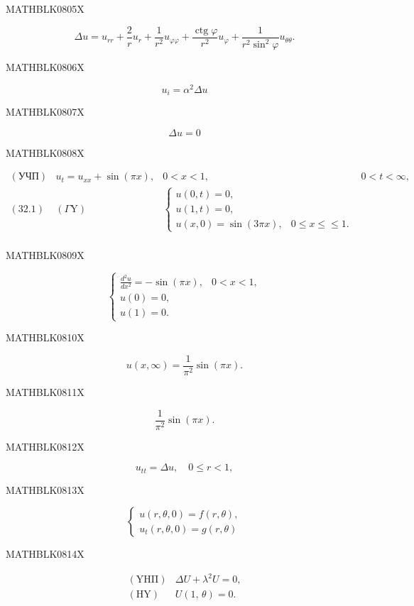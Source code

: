 \documentclass[
  ukrainian,
]{article}
\begin{document}
MATHBLK0805X

\[
\Delta u = u_{rr} + \frac{2}{r} u_r + \frac{1}{r^2} u_{\varphi\varphi} + \frac{\operatorname{ctg} \varphi}{r^2} u_{\varphi} + \frac{1}{r^2 \sin^2 \varphi} u_{\theta\theta}.
\]

MATHBLK0806X

\[
u_i = \alpha^2 \Delta u
\]

MATHBLK0807X

\[
\Delta u = 0
\]

MATHBLK0808X

\[
\begin{array}{llll} (\text{УЧП}) & u_t = u_{xx} + \sin{(\pi x)}, & 0 < x < 1, & 0 < t < \infty, \\ (32.1) & (\Gamma \text{Y}) & \begin{cases} u(0, t) = 0, \\ u(1, t) = 0, \\ u(x, 0) = \sin{(3\pi x)}, & 0 \le x \le \le 1. \end{cases} \\ \end{array}
\]

MATHBLK0809X

\[
\begin{cases} \frac{d^{2}u}{dx^{2}} = -\sin(\pi x), & 0 < x < 1, \\ u(0) = 0, \\ u(1) = 0. \end{cases}
\]

MATHBLK0810X

\[
u(x, \infty) = \frac{1}{\pi^2} \sin{(\pi x)}.
\]

MATHBLK0811X

\[
\frac{1}{\pi^2}\sin{(\pi x)}.
\]

MATHBLK0812X

\[
u_{tt} = \Delta u, \quad 0 \le r < 1,
\]

MATHBLK0813X

\[
\begin{cases} u(r, \theta, 0) = f(r, \theta), \\ u_t(r, \theta, 0) = g(r, \theta) \end{cases}
\]

MATHBLK0814X

\[
\begin{array}{llll} (\mathrm{Y}\mathrm{H}\mathrm{\Pi}) & \Delta U + \lambda^2 U = 0, \\ (\mathrm{H}\mathrm{Y}) & U\left(1,\,\theta\right) = 0. \end{array}
\]
\end{document}
